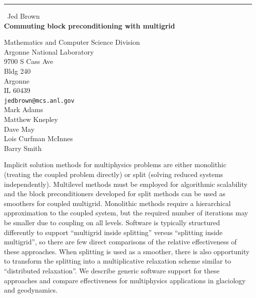 \documentclass{report}
\begin{document}
\begin{center}
\rule{6in}{1pt} \
{\large Jed Brown \\
{\bf Commuting block preconditioning with multigrid}}

Mathematics and Computer Science Division \\ Argonne National Laboratory \\ 9700 S Cass Ave \\ Bldg 240 \\ Argonne \\ IL 60439
\\
{\tt jedbrown@mcs.anl.gov}\\
Mark Adams\\
Matthew Knepley\\
Dave May\\
Lois Curfman McInnes\\
Barry Smith\end{center}

Implicit solution methods for multiphysics problems are either monolithic
(treating the coupled problem directly) or split (solving reduced systems
independently).
Multilevel methods must be employed for algorithmic scalability and the
block preconditioners developed for split methods can be used as
smoothers for coupled multigrid.
Monolithic methods require a hierarchical approximation to the coupled
system, but the required number of iterations may be smaller due to
coupling on all levels.
Software is typically structured differently to support ``multigrid
inside splitting'' versus ``splitting inside multigrid'', so there are
few direct comparisons of the relative effectiveness of these approaches.
When splitting is used as a smoother, there is also opportunity to
transform the splitting into a multiplicative relaxation scheme similar
to ``distributed relaxation''.
We describe generic software support for these approaches and compare
effectiveness for multiphysics applications in glaciology and
geodynamics.
\end{document}
